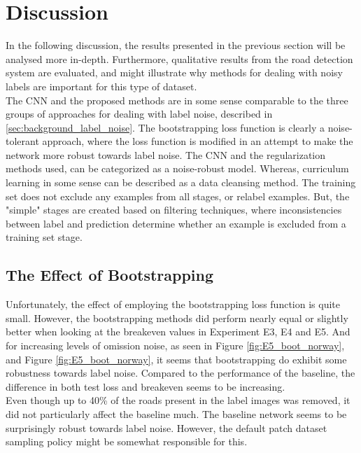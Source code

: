 \section{Discussion}
\label{sec:Discussion}
In the following discussion, the results presented in the previous section will be analysed more in-depth. Furthermore, qualitative results from the road detection system are evaluated, and might illustrate why methods for dealing with noisy labels are important for this type of dataset.\\

The \ac{CNN} and the proposed methods are in some sense comparable to the three groups of approaches for dealing with label noise, described in \ref{sec:background_label_noise}. The bootstrapping loss function is clearly a noise-tolerant approach, where the loss function is modified in an attempt to make the network more robust towards label noise. The \ac{CNN} and the regularization methods used, can be categorized as a noise-robust model. Whereas, curriculum learning in some sense can be described as a data cleansing method. The training set does not exclude any examples from all stages, or relabel examples. But, the "simple" stages are created based on filtering techniques, where inconsistencies between label and prediction determine whether an example is excluded from a training set stage.  \\


\subsection{The Effect of Bootstrapping}
Unfortunately, the effect of employing the bootstrapping loss function is quite small. However, the bootstrapping methods did perform nearly equal or slightly better when looking at the breakeven values in Experiment E3, E4 and E5. And for increasing levels of omission noise,  as seen in Figure \ref{fig:E5_boot_norway}, and Figure \ref{fig:E5_boot_norway}, it seems that bootstrapping do exhibit some robustness towards label noise. Compared to the performance of the baseline, the difference in both test loss and breakeven seems to be increasing.  \\

Even though up to 40\% of the roads present in the label images was removed, it did not particularly affect the baseline much. The baseline network seems to be surprisingly robust towards label noise. However, the default patch dataset sampling policy might be somewhat responsible for this.\\

